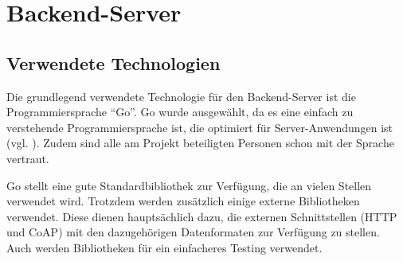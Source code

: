 \section{Backend-Server}

\subsection{Verwendete Technologien} \label{sec:impl-server-technology}

Die grundlegend verwendete Technologie für den Backend-Server ist die Programmiersprache \enquote{Go}.
Go wurde ausgewählt, da es eine einfach zu verstehende Programmiersprache ist, die optimiert für Server-Anwendungen ist (vgl. \cite{Weigend2019}).
Zudem sind alle am Projekt beteiligten Personen schon mit der Sprache vertraut.

Go stellt eine gute Standardbibliothek zur Verfügung, die an vielen Stellen verwendet wird.
Trotzdem werden zusätzlich einige externe Bibliotheken verwendet.
Diese dienen hauptsächlich dazu, die externen Schnittstellen (\gls{HTTP} und \gls{CoAP}) mit den dazugehörigen Datenformaten zur Verfügung zu stellen.
Auch werden Bibliotheken für ein einfacheres Testing verwendet.

